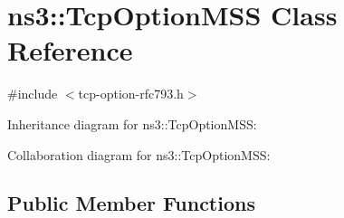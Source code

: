 \hypertarget{classns3_1_1TcpOptionMSS}{}\section{ns3\+:\+:Tcp\+Option\+M\+SS Class Reference}
\label{classns3_1_1TcpOptionMSS}


{\ttfamily \#include $<$tcp-\/option-\/rfc793.\+h$>$}



Inheritance diagram for ns3\+:\+:Tcp\+Option\+M\+SS\+:


Collaboration diagram for ns3\+:\+:Tcp\+Option\+M\+SS\+:
\subsection*{Public Member Functions}
